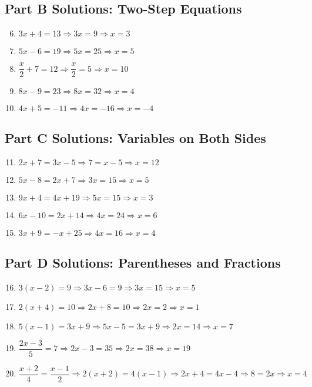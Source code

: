 \documentclass[14pt]{extarticle}
\begin{document}
\subsection*{Part B Solutions: Two-Step Equations}
\begin{enumerate}
    \setcounter{enumi}{5}
    \item \(3x + 4 = 13 \Rightarrow 3x = 9 \Rightarrow x = \boxed{3}\)
    \item \(5x - 6 = 19 \Rightarrow 5x = 25 \Rightarrow x = \boxed{5}\)
    \item \(\dfrac{x}{2} + 7 = 12 \Rightarrow \dfrac{x}{2} = 5 \Rightarrow x = \boxed{10}\)
    \item \(8x - 9 = 23 \Rightarrow 8x = 32 \Rightarrow x = \boxed{4}\)
    \item \(4x + 5 = -11 \Rightarrow 4x = -16 \Rightarrow x = \boxed{-4}\)
\end{enumerate}

\subsection*{Part C Solutions: Variables on Both Sides}
\begin{enumerate}
    \setcounter{enumi}{10}
    \item \(2x + 7 = 3x - 5 \Rightarrow 7 = x - 5 \Rightarrow x = \boxed{12}\)
    \item \(5x - 8 = 2x + 7 \Rightarrow 3x = 15 \Rightarrow x = \boxed{5}\)
    \item \(9x + 4 = 4x + 19 \Rightarrow 5x = 15 \Rightarrow x = \boxed{3}\)
    \item \(6x - 10 = 2x + 14 \Rightarrow 4x = 24 \Rightarrow x = \boxed{6}\)
    \item \(3x + 9 = -x + 25 \Rightarrow 4x = 16 \Rightarrow x = \boxed{4}\)
\end{enumerate}

\subsection*{Part D Solutions: Parentheses and Fractions}
\begin{enumerate}
    \setcounter{enumi}{15}
    \item \(3(x - 2) = 9 \Rightarrow 3x - 6 = 9 \Rightarrow 3x = 15 \Rightarrow x = \boxed{5}\)
    \item \(2(x + 4) = 10 \Rightarrow 2x + 8 = 10 \Rightarrow 2x = 2 \Rightarrow x = \boxed{1}\)
    \item \(5(x - 1) = 3x + 9 \Rightarrow 5x - 5 = 3x + 9 \Rightarrow 2x = 14 \Rightarrow x = \boxed{7}\)
    \item \(\dfrac{2x - 3}{5} = 7 \Rightarrow 2x - 3 = 35 \Rightarrow 2x = 38 \Rightarrow x = \boxed{19}\)
    \item \(\dfrac{x + 2}{4} = \dfrac{x - 1}{2} \Rightarrow 2(x + 2) = 4(x - 1) \Rightarrow 2x + 4 = 4x - 4 \Rightarrow 8 = 2x \Rightarrow x = \boxed{4}\)
\end{enumerate}
\end{document}
